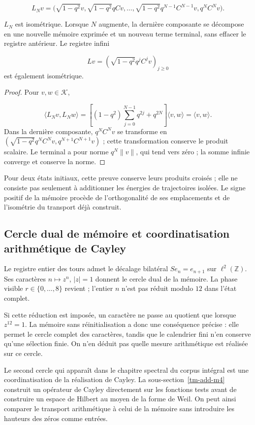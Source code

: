\[
L_Nv=\bigl(\sqrt{1-q^2}v,
\sqrt{1-q^2}qCv,\ldots,
\sqrt{1-q^2}q^{N-1}C^{N-1}v, q^NC^Nv\bigr).
\]
\begin{proposition}
\label{tm-add-proposicion-costura-2}
\(L_N\) est isométrique. Lorsque \(N\) augmente, la dernière composante se décompose en une nouvelle mémoire exprimée et un nouveau terme terminal, sans effacer le registre antérieur. Le registre infini

\[
Lv=\left(\sqrt{1-q^2}q^jC^jv\right)_{j\geq0}
\]
est également isométrique.
\end{proposition}

\begin{proof}
Pour \(v,w\in\mathcal K\),

\[
\langle L_Nv,L_Nw\rangle
=\left[(1-q^2)\sum_{j=0}^{N-1}q^{2j}+q^{2N}\right]
\langle v,w\rangle=\langle v,w\rangle.
\]
Dans la dernière composante, \(q^NC^Nv\) se transforme en \((\sqrt{1-q^2}q^NC^Nv,q^{N+1}C^{N+1}v)\) ; cette transformation conserve le produit scalaire. Le terminal a pour norme \(q^N\|v\|\), qui tend vers zéro ; la somme infinie converge et conserve la norme.
\end{proof}

Pour deux états initiaux, cette preuve conserve leurs produits croisés ; elle ne consiste pas seulement à additionner les énergies de trajectoires isolées. Le signe positif de la mémoire procède de l'orthogonalité de ses emplacements et de l'isométrie du transport déjà construit.


\subsection{Cercle dual de mémoire et coordinatisation arithmétique de Cayley}
\label{tm-add-c4}
Le registre entier des tours admet le décalage bilatéral \(Se_n=e_{n+1}\) sur \(\ell^2(\mathbb Z)\). Ses caractères \(n\mapsto z^n\), \(|z|=1\) donnent le cercle dual de la mémoire. La phase visible \(r\in\{0,\ldots,8\}\) revient ; l'entier \(n\) n'est pas réduit modulo \(12\) dans l'état complet.

Si cette réduction est imposée, un caractère ne passe au quotient que lorsque \(z^{12}=1\). La mémoire sans réinitialisation a donc une conséquence précise : elle permet le cercle complet des caractères, tandis que le calendrier fini n'en conserve qu'une sélection finie. On n'en déduit pas quelle mesure arithmétique est réalisée sur ce cercle.

Le second cercle qui apparaît dans le chapitre spectral du corpus intégral est une coordinatisation de la réalisation de Cayley. La sous-section~\ref{tm-add-m4} construit un opérateur de Cayley directement sur les fonctions tests avant de construire un espace de Hilbert au moyen de la forme de Weil. On peut ainsi comparer le transport arithmétique à celui de la mémoire sans introduire les hauteurs des zéros comme entrées.



